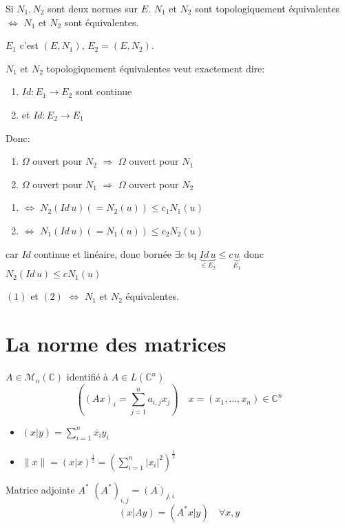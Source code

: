 \documentclass[a4paper]{report}
\let\implies\Rightarrow
\let\iff\Leftrightarrow
\theoremstyle{definition}
\begin{document}
\begin{theorem}
    Si $N_1, N_2$ sont deux normes sur $E$.  $N_1$ et $N_2$ sont topologiquement équivalentes $\iff$ $N_1$ et $N_2$ sont équivalentes.
\end{theorem}
\begin{preuve}
   $E_1$ c'est $(E, N_1)$, $E_2 = (E, N_2)$.
   \par
   $N_1$ et $N_2$ topologiquement équivalentes veut exactement dire:
   \begin{enumerate}
       \item $Id: E_1 \to E_2$ sont continue 
       \item et $Id: E_2 \to E_1$
   \end{enumerate}
   Donc:
   \begin{enumerate}
       \item $\Omega$ ouvert  pour $N_2$ $\implies$ $\Omega$ ouvert  pour  $N_1$
       \item $\Omega$ ouvert  pour $N_1$ $\implies$ $\Omega$ ouvert pour  $N_2$
   \end{enumerate}

   \begin{enumerate}
       \item $\iff$ $N_2(Id \, u) (= N_2(u)) \le c_1N_1(u)$
       \item $\iff$ $N_1(Id \, u) (= N_1(u)) \le c_2N_2(u)$
   \end{enumerate}
   car $Id$ continue et linéaire, donc bornée  $\exists c$ tq $\underbrace{Id \, u}_{\in E_2} \le c \underbrace{u}_{E_1}$ donc $N_2(Id \, u) \le c N_1(u)$
   \par
   $(1)$ et  $(2)$  $\iff$ $N_1$ et $N_2$ équivalentes.
\end{preuve}

\section{La norme des matrices}
$A \in \mathcal{M}_n(\mathbb{C})$ identifié à $A \in L(\mathbb{C}^n)$
\[
    \left( (Ax)_{i} = \sum_{j=1}^{n} a_{i, j}x_j \right) \quad x = (x_1, \ldots, x_n) \in \mathbb{C}^n
\] 
\begin{itemize}
    \item $(x|y) = \sum_{i=1}^{n} \overline{x_i}y_i$
    \item $\|x\| = (x|x)^{\frac{1}{2}} = \left( \sum_{i=1}^{n} |x_i|^2 \right)^{\frac{1}{2}}$
\end{itemize}
Matrice adjointe $A^*$  $(A^*)_{i,j} = \overline{(A)_{j,i}}$
 \[
     (x|Ay) = (A^*x|y) \quad \forall x,y
 \] 
\end{document}
